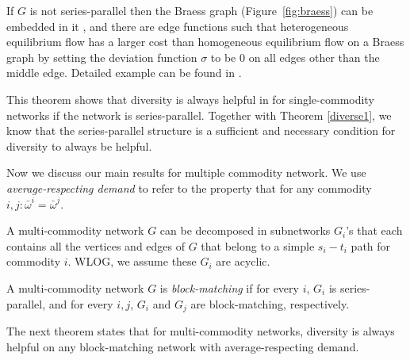 \begin{proof-sketch}
    If $G$ is not series-parallel then the Braess graph (Figure~\ref{fig:braess}) can be embedded in it \cite{Valdes:1979:RSP:800135.804393}, and there are edge functions such that heterogeneous equilibrium flow has a larger cost than homogeneous equilibrium flow on a Braess graph by setting the deviation function $\sigma$ to be $0$ on all edges other than the middle edge. Detailed example can be found in \cite{ijcai2018-24}.
\end{proof-sketch}

This theorem shows that diversity is always helpful in for single-commodity networks if the network is series-parallel. Together with Theorem \ref{diverse1}, we know that the series-parallel structure is a sufficient and necessary condition for diversity to always be helpful.

Now we discuss our main results for multiple commodity network. We use {\it average-respecting demand} to refer to the property that for any commodity $i,j: \bar{\omega}^i=\bar{\omega}^j$. 

A multi-commodity network $G$ can be decomposed in subnetworks $G_i$'s that each contains all the vertices and edges of $G$ that belong to a simple $s_i-t_i$ path for commodity $i$. WLOG, we assume these $G_i$ are acyclic.

\begin{definition}
    A multi-commodity network $G$ is {\it block-matching} if for every $i$, $G_i$ is series-parallel, and for every $i, j$, $G_i$ and $G_j$ are block-matching, respectively. 
\end{definition}

\begin{center}

\end{center}

The next theorem states that for multi-commodity networks, diversity is always helpful on any block-matching network with average-respecting demand. 


